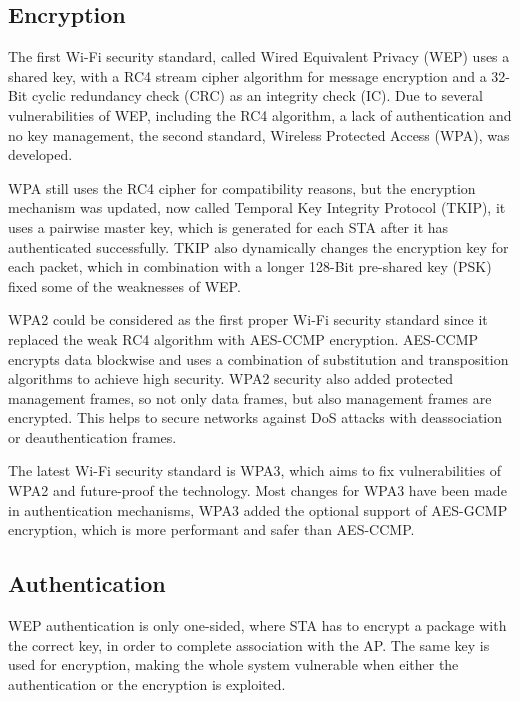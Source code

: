 \subsection{Encryption}

The first Wi-Fi security standard, called Wired Equivalent Privacy (WEP) uses a shared key, with a RC4 stream cipher algorithm for message encryption and a 32-Bit cyclic redundancy check (CRC) as an integrity check (IC).
Due to several vulnerabilities of WEP, including the RC4 algorithm, a lack of authentication and no key management, the second standard, Wireless Protected Access (WPA), was developed.

WPA still uses the RC4 cipher for compatibility reasons, but the encryption mechanism was updated, now called Temporal Key Integrity Protocol (TKIP), it uses a pairwise master key, which is generated for each STA after it has authenticated successfully.
TKIP also dynamically changes the encryption key for each packet, which in combination with a longer 128-Bit pre-shared key (PSK) fixed some of the weaknesses of WEP. \cite{Oriyano_2017}

WPA2 could be considered as the first proper Wi-Fi security standard since it replaced the weak RC4 algorithm with AES-CCMP encryption.
AES-CCMP encrypts data blockwise and uses a combination of substitution and transposition algorithms to achieve high security.
WPA2 security also added protected management frames, so not only data frames, but also management frames are encrypted.
This helps to secure networks against DoS attacks with deassociation or deauthentication frames.

The latest Wi-Fi security standard is WPA3, which aims to fix vulnerabilities of WPA2 and future-proof the technology.
Most changes for WPA3 have been made in authentication mechanisms, WPA3 added the optional support of AES-GCMP encryption, which is more performant and safer than AES-CCMP. \cite[page~103-117]{Sankaran_Gulasekaran_2021}


\subsection{Authentication}

WEP authentication is only one-sided, where STA has to encrypt a package with the correct key, in order to complete association with the AP. 
The same key is used for encryption, making the whole system vulnerable when either the authentication or the encryption is exploited. 

